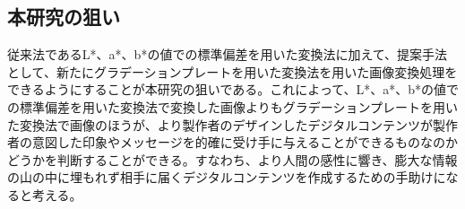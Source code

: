 \newpage
\subsection{本研究の狙い}
従来法であるL*、a*、b*の値での標準偏差を用いた変換法に加えて、提案手法として、新たにグラデーションプレートを用いた変換法を用いた画像変換処理をできるようにすることが本研究の狙いである。これによって、L*、a*、b*の値での標準偏差を用いた変換法で変換した画像よりもグラデーションプレートを用いた変換法で画像のほうが、より製作者のデザインしたデジタルコンテンツが製作者の意図した印象やメッセージを的確に受け手に与えることができるものなのかどうかを判断することができる。すなわち、より人間の感性に響き、膨大な情報の山の中に埋もれず相手に届くデジタルコンテンツを作成するための手助けになると考える。

